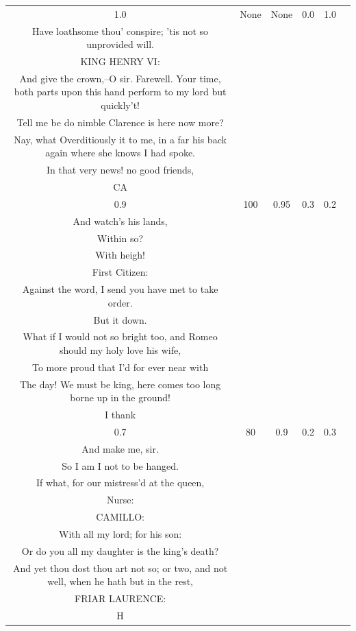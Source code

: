 \documentclass[11pt]{book}
\theoremstyle{plain}
\theoremstyle{definition}
\begin{document}
\begin{longtable}{ccccc >{\raggedright\arraybackslash}p{8cm}}
    1.0 & None & None & 0.0 & 1.0 &
    \begin{tcolorbox}[breakable, enhanced jigsaw, frame hidden, colback=white, boxrule=0pt]
    KING RICHARD:\\
    Have loathsome thou' conspire; 'tis not so unprovided will.\\
    KING HENRY VI:\\
    And give the crown,--O sir. Farewell. Your time, both parts upon this hand perform to my lord but quickly't!\\
    Tell me be do nimble Clarence is here now more?\\
    Nay, what Overditiously it to me, in a far his back again where she knows I had spoke.\\
    In that very news! no good friends,\\
    CA
    \end{tcolorbox} \\
    
    0.9 & 100 & 0.95 & 0.3 & 0.2 &
    \begin{tcolorbox}[breakable, enhanced jigsaw, frame hidden, colback=white, boxrule=0pt]
    KING RICHARD: \\
    And watch's his lands,\\
    Within so?\\
    With heigh!\\
    First Citizen:\\
    Against the word, I send you have met to take order.\\
    But it down.\\
    What if I would not so bright too, and Romeo should my holy love his wife,\\
    To more proud that I'd for ever near with\\
    The day! We must be king, here comes too long borne up in the ground!\\
    I thank
    \end{tcolorbox} \\
    

    0.7 & 80 & 0.9 & 0.2 & 0.3 &
    \begin{tcolorbox}[breakable, enhanced jigsaw, frame hidden, colback=white, boxrule=0pt]
    KING RICHARD: \\
    And make me, sir. \\
    So I am I not to be hanged. \\
    If what, for our mistress'd at the queen, \\
    Nurse: \\
    CAMILLO: \\
    With all my lord; for his son: \\
    Or do you all my daughter is the king's death? \\
    And yet thou dost thou art not so; or two, and not well, when he hath but in the rest, \\
    FRIAR LAURENCE: \\
    H
    \end{tcolorbox} \\
    
    
    \end{longtable}
\end{document}
